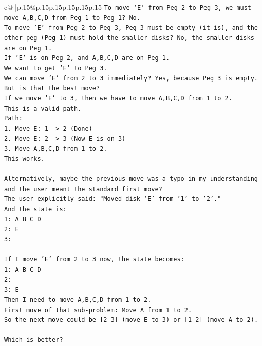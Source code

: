 \documentclass{article}
\begin{document}
{\begin{supertabular}{c@{$\;$}|p{.15\linewidth}@{}p{.15\linewidth}p{.15\linewidth}p{.15\linewidth}p{.15\linewidth}p{.15\linewidth}}
{{{\texttt{To move 'E' from Peg 2 to Peg 3, we must move A,B,C,D from Peg 1 to Peg 1? No.} \\
\texttt{To move 'E' from Peg 2 to Peg 3, Peg 3 must be empty (it is), and the other peg (Peg 1) must hold the smaller disks? No, the smaller disks are on Peg 1.} \\
\texttt{If 'E' is on Peg 2, and A,B,C,D are on Peg 1.} \\
\texttt{We want to get 'E' to Peg 3.} \\
\texttt{We can move 'E' from 2 to 3 immediately? Yes, because Peg 3 is empty.} \\
\texttt{But is that the best move?} \\
\texttt{If we move 'E' to 3, then we have to move A,B,C,D from 1 to 2.} \\
\texttt{This is a valid path.} \\
\texttt{Path:} \\
\texttt{1. Move E: 1 {-}> 2 (Done)} \\
\texttt{2. Move E: 2 {-}> 3 (Now E is on 3)} \\
\texttt{3. Move A,B,C,D from 1 to 2.} \\
\texttt{This works.} \\
\\ 
\texttt{Alternatively, maybe the previous move was a typo in my understanding and the user meant the standard first move?} \\
\texttt{The user explicitly said: "Moved disk 'E' from '1' to '2'."} \\
\texttt{And the state is:} \\
\texttt{1: A B C D} \\
\texttt{2: E} \\
\texttt{3:} \\
\\ 
\texttt{If I move 'E' from 2 to 3 now, the state becomes:} \\
\texttt{1: A B C D} \\
\texttt{2:} \\
\texttt{3: E} \\
\texttt{Then I need to move A,B,C,D from 1 to 2.} \\
\texttt{First move of that sub{-}problem: Move A from 1 to 2.} \\
\texttt{So the next move could be {[}2 3{]} (move E to 3) or {[}1 2{]} (move A to 2).} \\
\\ 
\texttt{Which is better?} \\
}}}
\end{supertabular}}
\end{document}
